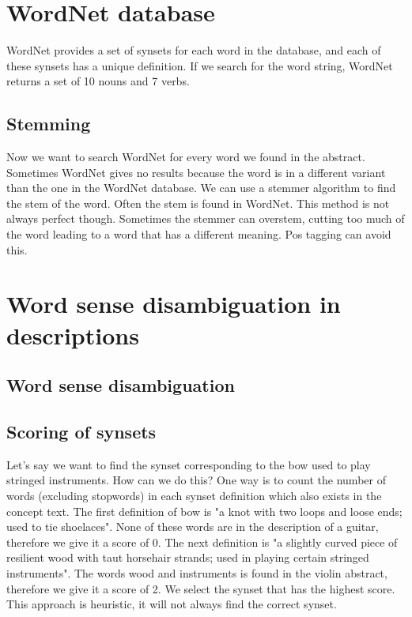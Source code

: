 
\section{WordNet database}
WordNet provides a set of synsets for each word in the database, and each of these synsets has a unique definition. If we search for the word string, WordNet returns a set of 10 nouns and 7 verbs. %

\subsection{Stemming}
Now we want to search WordNet for every word we found in the abstract. Sometimes WordNet gives no results because the word is in a different variant than the one in the WordNet database. We can use a stemmer algorithm to find the stem of the word. Often the stem is found in WordNet. This method is not always perfect though. Sometimes the stemmer can overstem, cutting too much of the word leading to a word that has a different meaning. %
Pos tagging can avoid this.


\section{Word sense disambiguation in descriptions}
\subsection{Word sense disambiguation}
\subsection{Scoring of synsets}
Let's say we want to find the synset corresponding to the bow used to play stringed instruments. How can we do this? One way is to count the number of words (excluding stopwords) in each synset definition which also exists in the concept text. The first definition of bow is "a knot with two loops and loose ends; used to tie shoelaces". None of these words are in the description of a guitar, therefore we give it a score of 0. The next definition is "a slightly curved piece of resilient wood with taut horsehair strands; used in playing certain stringed instruments". The words wood and instruments is found in the violin abstract, therefore we give it a score of 2. We select the synset that has the highest score. This approach is heuristic, it will not always find the correct synset.

